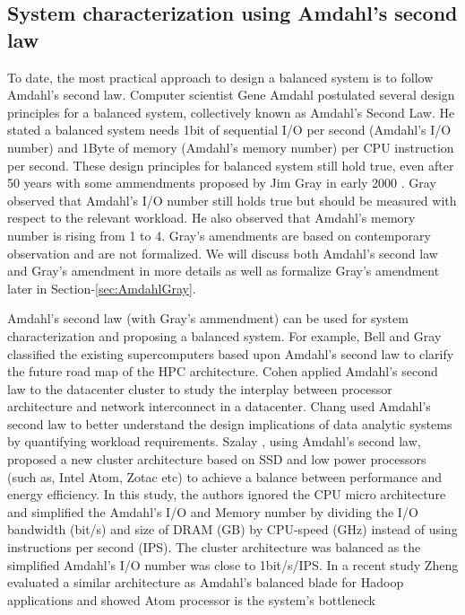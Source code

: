 \documentclass[journal]{IEEEtran}
\begin{document}
\subsection{System characterization using Amdahl's second law }
To date, the most practical approach to design a balanced system is to follow Amdahl's second law.  Computer scientist Gene Amdahl  postulated several design principles for a balanced system, collectively known as Amdahl's Second Law.  He stated a balanced system needs 1bit of sequential I/O per second (Amdahl's I/O number) and 1Byte of memory (Amdahl's memory number) per CPU instruction per second. These design principles for balanced system still hold true, even after 50 years with some ammendments proposed by Jim Gray in early 2000 \cite{Amdahl:RuleofThumbgray2000rules}. Gray observed that Amdahl's I/O number still holds true but should be measured with respect to the relevant workload. He also observed that  Amdahl's memory number is rising from 1 to 4. Gray's amendments are based on contemporary observation and are not formalized. We will discuss both Amdahl's second law and Gray's amendment in more details as well as formalize Gray's amendment later in Section-\ref{sec:AmdahlGray}. 

Amdahl's second law (with Gray's ammendment) can be used for system characterization and proposing a balanced system. For example, Bell and Gray \cite{Amdahl:PetascaleBell2005petascale} classified the existing supercomputers based upon Amdahl's second law to clarify the future road map of the HPC architecture. Cohen \cite{Balance:cohen2009applying} applied Amdahl’s second law to the datacenter cluster to study the interplay between processor architecture and network interconnect in a datacenter. Chang  \cite{Amdahl:Workloadchang} used Amdahl's second law to better understand the design implications of data analytic systems by quantifying workload requirements. Szalay \cite{cluster:AmdahlBalancedBlade}, using Amdahl's second law, proposed a new cluster architecture  based on SSD and low power processors (such as, Intel Atom, Zotac etc) to achieve a balance between performance and energy efficiency. In this study, the authors ignored the CPU micro architecture and simplified the Amdahl's I/O and Memory number by dividing the I/O bandwidth (bit/s) and size of DRAM (GB) by CPU-speed (GHz) instead of using instructions per second (IPS). The cluster architecture was balanced as the simplified Amdahl's I/O number was close to 1bit/s/IPS. In a recent study \cite{Balance:zheng2014hadoop} Zheng evaluated a similar architecture as Amdahl's balanced blade for Hadoop applications and showed Atom processor is the system's bottleneck  %
\end{document}
